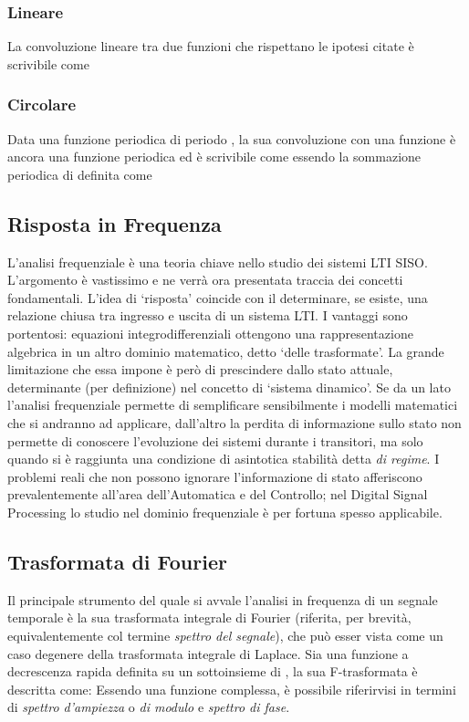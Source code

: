 		\subsubsection{Lineare}
La convoluzione lineare tra due funzioni che rispettano le ipotesi citate è scrivibile come 
		\subsubsection{Circolare}
Data una funzione periodica di periodo , la sua convoluzione con una funzione  è ancora una funzione periodica ed è scrivibile come
essendo  la sommazione periodica di  definita come
	\subsection{Risposta in Frequenza} %
L'analisi frequenziale è una teoria chiave nello studio dei sistemi LTI SISO. L'argomento è vastissimo e ne verrà ora presentata traccia dei concetti fondamentali.
L'idea di `risposta' coincide con il determinare, se esiste, una relazione chiusa tra ingresso e uscita di un sistema LTI. I vantaggi sono portentosi: equazioni integrodifferenziali ottengono una rappresentazione algebrica in un altro dominio matematico, detto `delle trasformate'.  La grande limitazione che essa impone è però di prescindere dallo stato attuale, determinante (per definizione) nel concetto di `sistema dinamico'.
Se da un lato l'analisi frequenziale permette di semplificare sensibilmente i modelli matematici che si andranno ad applicare, dall'altro la perdita di informazione sullo stato non permette di conoscere l'evoluzione dei sistemi durante i transitori, ma solo quando si è raggiunta una condizione di asintotica stabilità detta {\em di regime}. I problemi reali che non possono ignorare l'informazione di stato afferiscono prevalentemente all'area dell'Automatica e del Controllo; nel Digital Signal Processing lo studio nel dominio frequenziale è per fortuna spesso applicabile.
	\subsection{Trasformata di Fourier} %
Il principale strumento del quale si avvale l'analisi in frequenza di un segnale temporale è la sua trasformata integrale di Fourier (riferita, per brevità, equivalentemente col termine {\em spettro del segnale}), che può esser vista come un caso degenere della trasformata integrale di Laplace. Sia  una funzione a decrescenza rapida definita su un sottoinsieme di , la sua F-trasformata  è descritta come:
Essendo una funzione complessa, è possibile riferirvisi in termini di {\em spettro d'ampiezza} o {\em di modulo} e {\em spettro di fase}.
